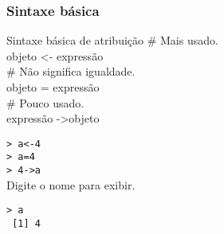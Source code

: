 \documentclass{beamer}
\begin{document}
 \begin{frame}
   \frametitle{Sintaxe básica}
   \begin{block}{Sintaxe básica de atribuição}
     \# Mais usado. \\
     objeto \textless- expressão  \\ \vspace{10pt}
    \# Não significa igualdade.\\
    objeto = expressão \\ \vspace{10pt} 
    \# Pouco usado.\\
    expressão -\textgreater objeto \hspace{10pt}        
   \end{block}
\pause
    \texttt{> a<-4\\
           > a=4 \\
           > 4->a\\}
 \pause
\vspace{8pt}
 Digite o nome para exibir.

      \texttt{> a \\
              ~[1] 4}
 \end{frame}
\end{document}
